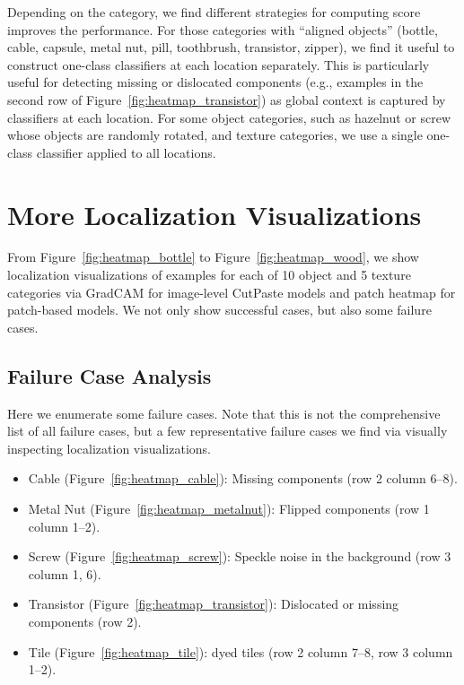 \documentclass[final]{cvpr}
\begin{document}
Depending on the category, we find different strategies for computing score improves the performance. For those categories with ``aligned objects'' (bottle, cable, capsule, metal nut, pill, toothbrush, transistor, zipper), we find it useful to construct one-class classifiers at each location separately. This is particularly useful for detecting missing or dislocated components (e.g., examples in the second row of Figure~\ref{fig:heatmap_transistor}) as global context is captured by classifiers at each location. For some object categories, such as hazelnut or screw whose objects are randomly rotated, and texture categories, we use a single one-class classifier applied to all locations.






\section{More Localization Visualizations}
\label{sec:app_localization}

From Figure~\ref{fig:heatmap_bottle} to Figure~\ref{fig:heatmap_wood}, we show localization visualizations of  examples for each of 10 object and 5 texture categories via GradCAM for image-level CutPaste models and patch heatmap for patch-based models. We not only show successful cases, but also some failure cases.

\subsection{Failure Case Analysis}
\label{sec:app_localization_failure}

Here we enumerate some failure cases. Note that this is not the comprehensive list of all failure cases, but a few representative failure cases we find via visually inspecting localization visualizations.

\begin{itemize}\setlength\itemsep{0em}
    \item {Cable (Figure~\ref{fig:heatmap_cable}): Missing components (row 2 column 6--8).}
    \item {Metal Nut (Figure~\ref{fig:heatmap_metalnut}): Flipped components (row 1 column 1--2).}
    \item {Screw (Figure~\ref{fig:heatmap_screw}): Speckle noise in the background (row 3 column 1, 6).}
    \item {Transistor (Figure~\ref{fig:heatmap_transistor}): Dislocated or missing components (row 2).}
    \item {Tile (Figure~\ref{fig:heatmap_tile}): dyed tiles (row 2 column 7--8, row 3 column 1--2).}
\end{itemize}
\end{document}
